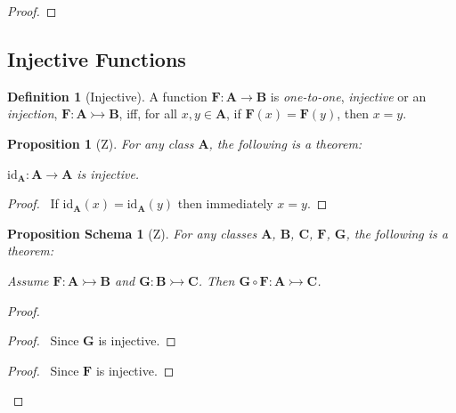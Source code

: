 \documentclass{book}
\let\qed\relax
\newtheorem{prop}[ax]{Proposition}
\newtheorem{props}[ax]{Proposition Schema}
\theoremstyle{definition}
\newtheorem{df}[ax]{Definition}
\newcommand{\id}[1]{\ensuremath{\mathrm{id}_{#1}}}
\begin{document}
\begin{proof}
\pf
{}
\qed
\end{proof}

\subsection{Injective Functions}

\begin{df}[Injective]
A function $\mathbf{F} : \mathbf{A} \rightarrow \mathbf{B}$ is \emph{one-to-one}, \emph{injective} or an \emph{injection}, $\mathbf{F} : \mathbf{A} \rightarrowtail \mathbf{B}$, iff, for all $x,y \in \mathbf{A}$, if $\mathbf{F}(x) = \mathbf{F}(y)$, then $x = y$.
\end{df}

\begin{prop}[Z]
\label{prop:idinj}
For any class $\mathbf{A}$, the following is a theorem:

$\id{\mathbf{A}} : \mathbf{A} \rightarrow \mathbf{A}$ is injective.
\end{prop}

\begin{proof}
\pf\ If $\id{\mathbf{A}}(x) = \id{\mathbf{A}}(y)$ then immediately $x = y$. \qed
\end{proof}

\begin{props}[Z]
\label{prop:compinj}
For any classes $\mathbf{A}$, $\mathbf{B}$, $\mathbf{C}$, $\mathbf{F}$, $\mathbf{G}$, the following is a theorem:

Assume $\mathbf{F} : \mathbf{A} \rightarrowtail \mathbf{B}$ and $\mathbf{G} : \mathbf{B} \rightarrowtail \mathbf{C}$. Then $\mathbf{G} \circ \mathbf{F} : \mathbf{A} \rightarrowtail \mathbf{C}$.
\end{props}

\begin{proof}
\pf
{}
\begin{proof}
	\pf\ Since $\mathbf{G}$ is injective.
\end{proof}
\begin{proof}
	\pf\ Since $\mathbf{F}$ is injective.
\end{proof}
\qed
\end{proof}
\end{document}
